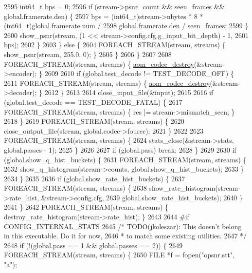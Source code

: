 \begin{DoxyCodeInclude}
{{{{{{{{{{{{{{{{{{{{{{{{{{{{{{{{{{{{{{{{{{{{{{{{{{{{{{{{{{{{{{2595           int64\_t bps = 0;
2596           \textcolor{keywordflow}{if} (stream->psnr\_count && seen\_frames && global.framerate.den) \{
2597             bps = (int64\_t)stream->nbytes * 8 * (int64\_t)global.framerate.num /
2598                   global.framerate.den / seen\_frames;
2599           \}
2600           show\_psnr(stream, (1 << stream->config.cfg.g\_input\_bit\_depth) - 1,
2601                     bps);
2602         \}
2603       \} \textcolor{keywordflow}{else} \{
2604         FOREACH\_STREAM(stream, streams) \{ show\_psnr(stream, 255.0, 0); \}
2605       \}
2606     \}
2607 
2608     FOREACH\_STREAM(stream, streams) \{ \hyperlink{group__codec_ga9b60e186f61ba2d6ab2b8069b76a15c5}{aom\_codec\_destroy}(&stream->encoder); \}
2609 
2610     \textcolor{keywordflow}{if} (global.test\_decode != TEST\_DECODE\_OFF) \{
2611       FOREACH\_STREAM(stream, streams) \{ \hyperlink{group__codec_ga9b60e186f61ba2d6ab2b8069b76a15c5}{aom\_codec\_destroy}(&stream->decoder); \}
2612     \}
2613 
2614     close\_input\_file(&input);
2615 
2616     \textcolor{keywordflow}{if} (global.test\_decode == TEST\_DECODE\_FATAL) \{
2617       FOREACH\_STREAM(stream, streams) \{ res |= stream->mismatch\_seen; \}
2618     \}
2619     FOREACH\_STREAM(stream, streams) \{
2620       close\_output\_file(stream, global.codec->fourcc);
2621     \}
2622 
2623     FOREACH\_STREAM(stream, streams) \{
2624       stats\_close(&stream->stats, global.passes - 1);
2625     \}
2626 
2627     \textcolor{keywordflow}{if} (global.pass) \textcolor{keywordflow}{break};
2628   \}
2629 
2630   \textcolor{keywordflow}{if} (global.show\_q\_hist\_buckets) \{
2631     FOREACH\_STREAM(stream, streams) \{
2632       show\_q\_histogram(stream->counts, global.show\_q\_hist\_buckets);
2633     \}
2634   \}
2635 
2636   \textcolor{keywordflow}{if} (global.show\_rate\_hist\_buckets) \{
2637     FOREACH\_STREAM(stream, streams) \{
2638       show\_rate\_histogram(stream->rate\_hist, &stream->config.cfg,
2639                           global.show\_rate\_hist\_buckets);
2640     \}
2641   \}
2642   FOREACH\_STREAM(stream, streams) \{ destroy\_rate\_histogram(stream->rate\_hist); \}
2643 
2644 \textcolor{preprocessor}{#if CONFIG\_INTERNAL\_STATS}
2645   \textcolor{comment}{/* TODO(jkoleszar): This doesn't belong in this executable. Do it for now,}
2646 \textcolor{comment}{   * to match some existing utilities.}
2647 \textcolor{comment}{   */}
2648   \textcolor{keywordflow}{if} (!(global.pass == 1 && global.passes == 2)) \{
2649     FOREACH\_STREAM(stream, streams) \{
2650       FILE *f = fopen(\textcolor{stringliteral}{"opsnr.stt"}, \textcolor{stringliteral}{"a"});
}}}}}}}}}}}}}}}}}}}}}}}}}}}}}}}}}}}}}}}}}}}}}}}}}}}}}}}}}}}}}}
\end{DoxyCodeInclude}
